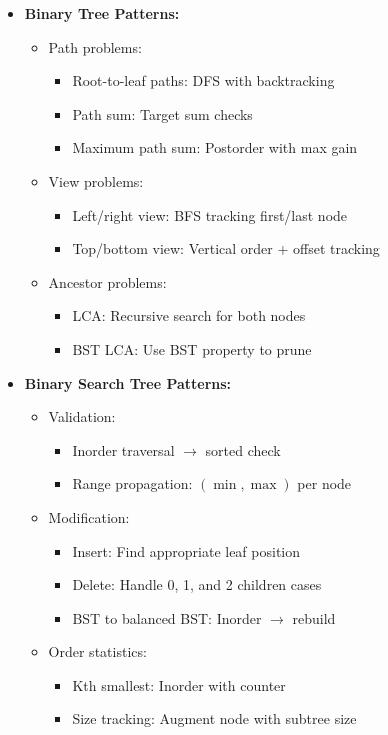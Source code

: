 \documentclass[a4paper,10pt]{book}
\begin{document}
\begin{itemize}
    \item \textbf{Binary Tree Patterns:}
    \begin{itemize}
        \item Path problems:
        \begin{itemize}
            \item Root-to-leaf paths: DFS with backtracking
            \item Path sum: Target sum checks
            \item Maximum path sum: Postorder with max gain
        \end{itemize}
        \item View problems:
        \begin{itemize}
            \item Left/right view: BFS tracking first/last node
            \item Top/bottom view: Vertical order + offset tracking
        \end{itemize}
        \item Ancestor problems:
        \begin{itemize}
            \item LCA: Recursive search for both nodes
            \item BST LCA: Use BST property to prune
        \end{itemize}
    \end{itemize}
    
    \item \textbf{Binary Search Tree Patterns:}
    \begin{itemize}
        \item Validation:
        \begin{itemize}
            \item Inorder traversal $\rightarrow$ sorted check
            \item Range propagation: $(\min, \max)$ per node
        \end{itemize}
        \item Modification:
        \begin{itemize}
            \item Insert: Find appropriate leaf position
            \item Delete: Handle 0, 1, and 2 children cases
            \item BST to balanced BST: Inorder $\rightarrow$ rebuild
        \end{itemize}
        \item Order statistics:
        \begin{itemize}
            \item Kth smallest: Inorder with counter
            \item Size tracking: Augment node with subtree size
        \end{itemize}
    \end{itemize}
    

\end{itemize}
\end{document}
